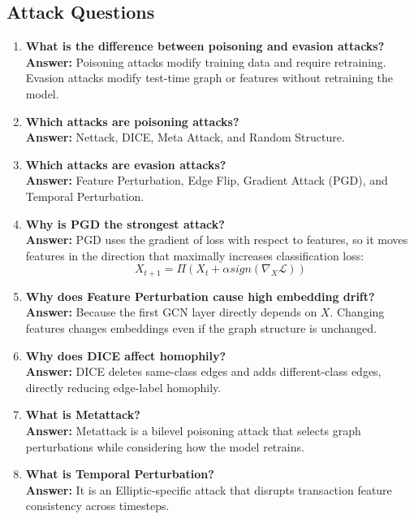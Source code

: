 \documentclass[12pt,a4paper]{article}
\begin{document}
\subsection{Attack Questions}
\begin{enumerate}[label=\textbf{Q\arabic*.},resume]
    \item \textbf{What is the difference between poisoning and evasion attacks?}\\
    \textbf{Answer:} Poisoning attacks modify training data and require retraining. Evasion attacks modify test-time graph or features without retraining the model.

    \item \textbf{Which attacks are poisoning attacks?}\\
    \textbf{Answer:} Nettack, DICE, Meta Attack, and Random Structure.

    \item \textbf{Which attacks are evasion attacks?}\\
    \textbf{Answer:} Feature Perturbation, Edge Flip, Gradient Attack (PGD), and Temporal Perturbation.

    \item \textbf{Why is PGD the strongest attack?}\\
    \textbf{Answer:} PGD uses the gradient of loss with respect to features, so it moves features in the direction that maximally increases classification loss:
    $$
    X_{t+1}=\Pi(X_t+\alpha sign(\nabla_X\mathcal{L}))
    $$

    \item \textbf{Why does Feature Perturbation cause high embedding drift?}\\
    \textbf{Answer:} Because the first GCN layer directly depends on $X$. Changing features changes embeddings even if the graph structure is unchanged.

    \item \textbf{Why does DICE affect homophily?}\\
    \textbf{Answer:} DICE deletes same-class edges and adds different-class edges, directly reducing edge-label homophily.

    \item \textbf{What is Metattack?}\\
    \textbf{Answer:} Metattack is a bilevel poisoning attack that selects graph perturbations while considering how the model retrains.

    \item \textbf{What is Temporal Perturbation?}\\
    \textbf{Answer:} It is an Elliptic-specific attack that disrupts transaction feature consistency across timesteps.
\end{enumerate}
\end{document}
